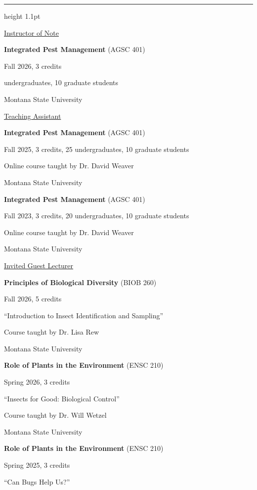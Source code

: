 \documentclass[10pt,letterpaper]{article}
\newcommand{\cvsection}[1]{\par\vspace{11pt}{\large\bfseries\MakeUppercase{#1}}\par\vspace{1pt}\hrule height 1.1pt\vspace{6pt}\nopagebreak[4]}
\newcommand{\cvsub}[1]{\par\vspace{3pt}\uline{#1}\par\nopagebreak[4]\vspace{3pt}}
\begin{document}
\cvsection{Teaching}
\cvsub{Instructor of Note}
\noindent\textbf{Integrated Pest Management} (AGSC 401)\par
\noindent Fall 2026, 3 credits\par
{} undergraduates, 10 graduate students\par
\noindent Montana State University\par
\vspace{5pt}
\cvsub{Teaching Assistant}
\noindent\textbf{Integrated Pest Management} (AGSC 401)\par
\noindent Fall 2025, 3 credits, 25 undergraduates, 10 graduate students\par
\noindent Online course taught by Dr. David Weaver\par
\noindent Montana State University\par
\vspace{5pt}
\noindent\textbf{Integrated Pest Management} (AGSC 401)\par
\noindent Fall 2023, 3 credits, 20 undergraduates, 10 graduate students\par
\noindent Online course taught by Dr. David Weaver\par
\noindent Montana State University\par
\vspace{5pt}
\cvsub{Invited Guest Lecturer}
\noindent\textbf{Principles of Biological Diversity} (BIOB 260)\par
\noindent Fall 2026, 5 credits\par
\noindent “Introduction to Insect Identification and Sampling”\par
\noindent Course taught by Dr. Lisa Rew\par
\noindent Montana State University\par
\vspace{5pt}
\noindent\textbf{Role of Plants in the Environment} (ENSC 210)\par
\noindent Spring 2026, 3 credits\par
\noindent “Insects for Good: Biological Control”\par
\noindent Course taught by Dr. Will Wetzel\par
\noindent Montana State University\par
\vspace{5pt}
\noindent\textbf{Role of Plants in the Environment} (ENSC 210)\par
\noindent Spring 2025, 3 credits\par
\noindent “Can Bugs Help Us?”\par
\end{document}
